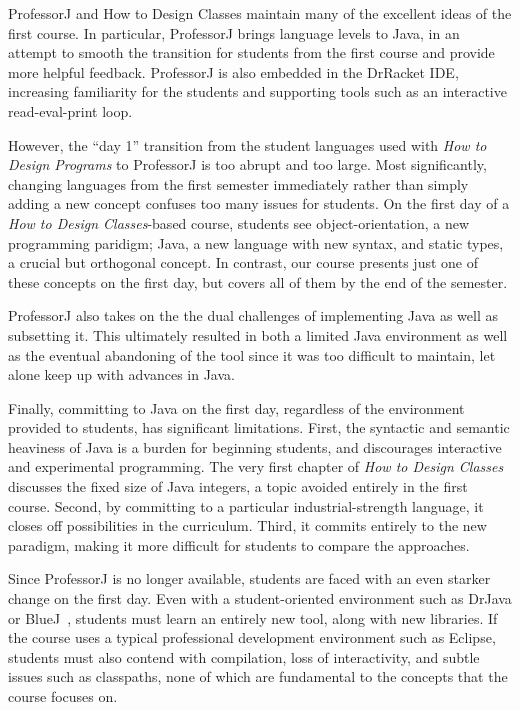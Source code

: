 \documentclass[submission,copyright]{eptcs}
\begin{document}
ProfessorJ and How to Design Classes maintain many of the excellent
ideas of the first course.  In particular, ProfessorJ brings language
levels to Java, in an attempt to smooth the transition for students
from the first course and provide more helpful feedback.  ProfessorJ
is also embedded in the DrRacket IDE, increasing familiarity for the
students and supporting tools such as an interactive read-eval-print
loop. 

\def\htdp{\emph{How to Design Programs}\xspace}
\def\htdc{\emph{How to Design Classes}\xspace}
\def\profj{{ProfessorJ}\xspace}

However, the ``day 1'' transition from the student languages used with
\htdp to \profj is too abrupt and too large.
%
Most significantly, changing languages from the first semester
immediately rather than simply adding a new concept confuses too many
issues for students.  On the first day of a \htdc-based course,
students see object-orientation, a new programming paridigm; Java, a
new language with new syntax, and static types, a crucial but
orthogonal concept.
%
In contrast, our course presents just one of these concepts on the
first day, but  covers all of them by the end of the semester.

\profj also takes on the the dual challenges of implementing Java as
well as subsetting it.  This ultimately resulted in both a limited
Java environment as well as the eventual abandoning of the tool since
it was too difficult to maintain, let alone keep up with advances in
Java.  

Finally, committing to Java on the first day, regardless of the
environment provided to students, has significant limitations.  First,
the syntactic and semantic heaviness of Java is a burden for beginning
students, and discourages interactive and experimental programming.
The very first chapter of \htdc discusses the fixed size of Java integers,
a topic avoided entirely in the first course.
Second, by committing to a particular industrial-strength language, it
closes off possibilities in the curriculum.  Third, it commits
entirely to the new paradigm, making it more difficult for students to
compare the approaches. 

Since \profj is no longer available, students are faced with an even
starker change on the first day.  Even with a student-oriented
environment such as DrJava or BlueJ~\cite{dvanhorn:Allen2002DrJava,
  dvanhorn:Hsia2005Taming}, students must learn an entirely new tool,
along with new libraries.
If the course uses a typical professional development environment such
as Eclipse, students must also contend with compilation, loss of
interactivity, and subtle issues such as classpaths, none of which are
fundamental to the concepts that the course focuses on.
\end{document}
